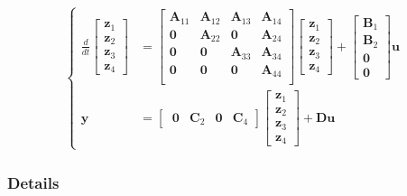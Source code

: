 \documentclass[letterpaper,10pt,english]{jupyterBook}
\begin{document}
\begin{equation*}
\begin{split}\left\{\begin{aligned}
  \frac{d}{dt} \begin{bmatrix} \mathbf{z}_1 \\ \mathbf{z}_2 \\ \mathbf{z}_3 \\ \mathbf{z}_4 \end{bmatrix} & =
  \begin{bmatrix} 
     \mathbf{A}_{11} & \mathbf{A}_{12} & \mathbf{A}_{13} & \mathbf{A}_{14} \\ 
     \mathbf{0}      & \mathbf{A}_{22} & \mathbf{0}      & \mathbf{A}_{24} \\ 
     \mathbf{0}      & \mathbf{0}      & \mathbf{A}_{33} & \mathbf{A}_{34} \\ 
     \mathbf{0}      & \mathbf{0}      & \mathbf{0}      & \mathbf{A}_{44} \\ 
  \end{bmatrix}
  \begin{bmatrix} \mathbf{z}_1 \\ \mathbf{z}_2 \\ \mathbf{z}_3 \\ \mathbf{z}_4 \end{bmatrix} +
  \begin{bmatrix} \mathbf{B}_1 \\ \mathbf{B}_2 \\ \mathbf{0} \\ \mathbf{0} \end{bmatrix} \mathbf{u} \\
  \mathbf{y} & = \begin{bmatrix} \ \mathbf{0} & \mathbf{C}_2 & \mathbf{0} & \mathbf{C}_4 \end{bmatrix}
  \begin{bmatrix} \mathbf{z}_1 \\ \mathbf{z}_2 \\ \mathbf{z}_3 \\ \mathbf{z}_4 \end{bmatrix} +
  \mathbf{D} \mathbf{u} 
\end{aligned}\right.\end{split}
\end{equation*}\subsubsection*{Details}
\end{document}
